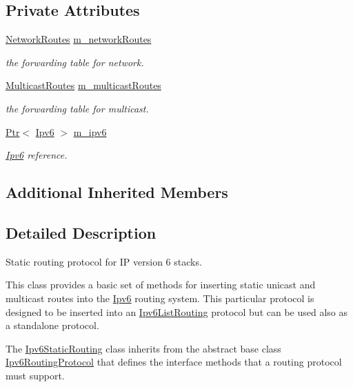 \subsection*{Private Attributes}
\begin{DoxyCompactItemize}
\item 
\hyperlink{classns3_1_1Ipv6StaticRouting_aa2ac656240490a12d7d3a834a75af7fd}{Network\+Routes} \hyperlink{classns3_1_1Ipv6StaticRouting_ac6d146555b173ef5ca8028ab981f8ab6}{m\+\_\+network\+Routes}
\begin{DoxyCompactList}\small\item\em the forwarding table for network. \end{DoxyCompactList}\item 
\hyperlink{classns3_1_1Ipv6StaticRouting_a02421205cb9361483594fb8bd2286b12}{Multicast\+Routes} \hyperlink{classns3_1_1Ipv6StaticRouting_ab9690b202d45d5567be46567a4f782ac}{m\+\_\+multicast\+Routes}
\begin{DoxyCompactList}\small\item\em the forwarding table for multicast. \end{DoxyCompactList}\item 
\hyperlink{classns3_1_1Ptr}{Ptr}$<$ \hyperlink{classns3_1_1Ipv6}{Ipv6} $>$ \hyperlink{classns3_1_1Ipv6StaticRouting_aeb0293ac3549a6ca0ba7674d35646fc8}{m\+\_\+ipv6}
\begin{DoxyCompactList}\small\item\em \hyperlink{classns3_1_1Ipv6}{Ipv6} reference. \end{DoxyCompactList}\end{DoxyCompactItemize}
\subsection*{Additional Inherited Members}


\subsection{Detailed Description}
Static routing protocol for IP version 6 stacks. 

This class provides a basic set of methods for inserting static unicast and multicast routes into the \hyperlink{classns3_1_1Ipv6}{Ipv6} routing system. This particular protocol is designed to be inserted into an \hyperlink{classns3_1_1Ipv6ListRouting}{Ipv6\+List\+Routing} protocol but can be used also as a standalone protocol.

The \hyperlink{classns3_1_1Ipv6StaticRouting}{Ipv6\+Static\+Routing} class inherits from the abstract base class \hyperlink{classns3_1_1Ipv6RoutingProtocol}{Ipv6\+Routing\+Protocol} that defines the interface methods that a routing protocol must support.

